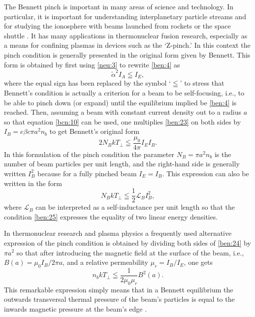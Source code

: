 \documentclass [12pt,a4paper,     ]{report} %
\begin{document}
   The Bennett pinch is important in many areas of science and technology.  In particular, it is important for understanding interplanetary particle streams \cite{ALFVE1939-, BENNE1955-} and for studying the ionosphere with beams launched from rockets \cite{GOUGH1980-} or the space shuttle \cite{KIWAM1977-, NEUPE1982-}.  It has many applications in thermonuclear fusion research, especially as a means for confining plasmas in devices such as the `Z-pinch.'  In this context the pinch condition is generally presented in the original form given by Bennett.  This form is obtained by first using \eqref{neu:3} to rewrite  \eqref{ben:4} as
%
\begin{equation}\label{ben:23} %
      \tilde{\alpha}^2 I_A \leqq I_E,
\end{equation}
%
where the equal sign has been replaced by the symbol `$\leqq$' to stress that Bennett's condition is actually a criterion for a beam to be self-focusing, i.e., to be able to pinch down (or expand) until the equilibrium implied be \eqref{ben:4} is reached.  Then, assuming a beam with constant current density out to a radius $a$ so that equation \eqref{bcn:10} can be used, one multiplies \eqref{ben:23} on both sides by $I_B= e\beta c \pi a^2 n_b$ to get Bennett's original form \cite[p.1589]{BENNE1955-}
%
\begin{equation}\label{ben:24} %
      2 N_B kT_{\perp} \leqq \frac{\mu_0}{4\pi} I_E I_B.
\end{equation}
%
In this formulation of the pinch condition the parameter $N_B=\pi a^2 n_b$ is the number of beam particles per unit length, and the right-hand side is generally written $I_B^2$ because for a fully pinched beam $I_E=I_B$.  This expression can also be written in the form
%
\begin{equation}\label{ben:25} %
          N_B kT_{\perp} \leqq \frac{1}{2} \mathcal{L}_B I_B^2,
\end{equation}
%
where $\mathcal{L}_B$ can be interpreted as a self-inductance per unit length so that the condition \eqref{ben:25} expresses the equality of two linear energy densities.

   In thermonuclear research and plasma physics a frequently used alternative expression of the pinch condition is obtained by dividing both sides of \eqref{ben:24} by $\pi a^2$ so that after introducing the magnetic field at the surface of the beam, i.e., $B(a)=\mu_0 I_B/2\pi a$, and a relative permeability $\mu_r = I_B / I_E$,  one gets
%
\begin{equation}\label{ben:26} %
      n_b kT_{\perp} \leqq \frac{1}{2\mu_0\mu_r} B^2(a).
\end{equation}
%
This remarkable expression simply means that in a Bennett equilibrium the outwards transversal thermal pressure of the beam's particles is equal to the inwards magnetic pressure at the beam's edge \cite[Sec.10.5]{JACKS1975-}.
\end{document}
